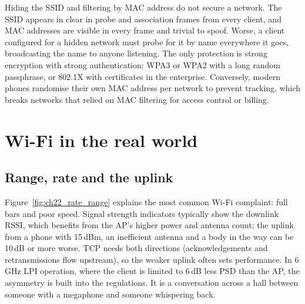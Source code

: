 
\begin{pitfall}
Hiding the SSID and filtering by MAC address do not secure a network. The SSID appears in clear in
probe and association frames from every client, and MAC addresses are visible in every frame and
trivial to spoof. Worse, a client configured for a hidden network must probe for it by name
everywhere it goes, broadcasting the name to anyone listening. The only protection is strong
encryption with strong authentication: WPA3 or WPA2 with a long random passphrase, or 802.1X with
certificates in the enterprise. Conversely, modern phones randomise their own MAC address per
network to prevent tracking, which breaks networks that relied on MAC filtering for access control or
billing.
\end{pitfall}

\section{Wi-Fi in the real world}
\label{sec:ch22:realworld}

\subsection{Range, rate and the uplink}

Figure~\ref{fig:ch22_rate_range} explains the most common Wi-Fi complaint: full bars and poor speed.
Signal strength indicators typically show the downlink RSSI, which benefits from the AP's higher
power and antenna count; the uplink from a phone with 15\,dBm, an inefficient antenna and a body in
the way can be 10\,dB or more worse. TCP needs both directions (acknowledgements and retransmissions
flow upstream), so the weaker uplink often sets performance. In 6\,GHz LPI operation, where the
client is limited to 6\,dB less PSD than the AP, the asymmetry is built into the regulations. It is a
conversation across a hall between someone with a megaphone and someone whispering back.


